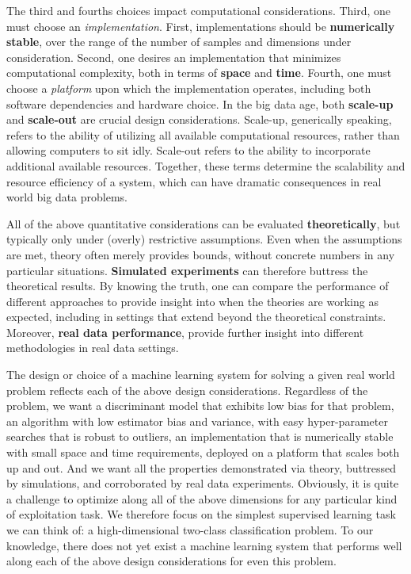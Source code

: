 \documentclass[10pt]{article}
\begin{document}
The third and fourths choices impact computational considerations.  Third, one must choose an \emph{implementation}.  First, implementations should be \textbf{numerically stable}, over the range  of the number of samples and dimensions under consideration.  Second, one desires an implementation that minimizes computational complexity, both in terms of  \textbf{space} and \textbf{time}.  
Fourth, one must choose a \emph{platform} upon which the implementation operates,  including both software dependencies and hardware choice.  In the big data age, both \textbf{scale-up} and \textbf{scale-out} are crucial design considerations.  Scale-up, generically speaking, refers to the ability of utilizing all available computational resources, rather than allowing computers to sit idly.  Scale-out refers to the ability to incorporate additional available resources.  Together, these terms determine the scalability and resource efficiency of a system, which can have dramatic consequences in real world big data problems.


All of the above quantitative considerations can be evaluated \textbf{theoretically}, but typically only under (overly) restrictive assumptions.  Even when the assumptions are met, theory often merely provides bounds, without concrete numbers in any particular situations. \textbf{Simulated experiments} can therefore buttress the theoretical results. By knowing the truth, one  can  compare the performance of different approaches to provide insight into when the theories are working as expected, including in settings that extend beyond the theoretical constraints.  Moreover, \textbf{real data performance}, provide further insight into different methodologies in real data settings.


The design or choice of a machine learning system for solving a given real world problem reflects each of the above design considerations.   Regardless of the problem, we want a discriminant model that exhibits low bias for that problem, an algorithm with low estimator bias and variance, with easy hyper-parameter searches that is robust to outliers, an implementation that is numerically stable with small space and time requirements, deployed on a platform that scales both up and out.  And we want all the properties demonstrated via theory, buttressed by simulations, and corroborated by real data experiments.  Obviously, it is quite a challenge to optimize along all of the above dimensions for any particular kind of exploitation task.  We therefore focus  on the simplest supervised learning task we can think of: a high-dimensional two-class classification problem.  To our knowledge, there does not yet exist a machine learning system that performs well along each of the above design considerations for even this problem.
\end{document}
